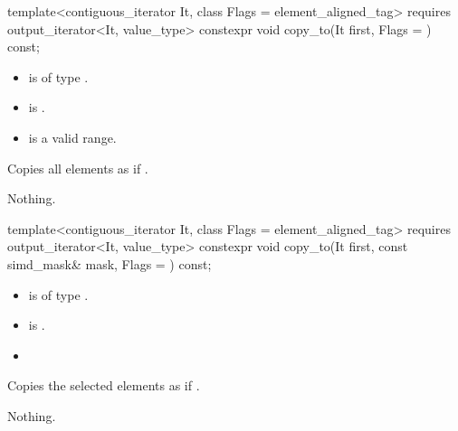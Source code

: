 \begin{itemdecl}
template<contiguous_iterator It, class Flags = element_aligned_tag>
  requires output_iterator<It, value_type>
  constexpr void copy_to(It first, Flags = {}) const;
\end{itemdecl}

\begin{itemdescr}
  \pnum\constraints
  \begin{itemize}
    \item {} is of type .
    \item {} is .
  \end{itemize}

  \pnum\requires
  \begin{itemize}
    \item \tcode{[first, first + size())} is a valid range.
  \end{itemize}

  \pnum\effects
  Copies all  elements as if  \foralli.

  \pnum\throws Nothing.
\end{itemdescr}

\begin{itemdecl}
template<contiguous_iterator It, class Flags = element_aligned_tag>
  requires output_iterator<It, value_type>
  constexpr void copy_to(It first, const simd_mask& mask, Flags = {}) const;
\end{itemdecl}

\begin{itemdescr}
  \pnum\constraints
  \begin{itemize}
    \item {} is of type .
    \item {} is .
  \end{itemize}

  \pnum\requires
  \begin{itemize}
    \item \validMaskedRange
  \end{itemize}

  \pnum\effects
  Copies the selected elements as if  \forallmaskedi.

  \pnum\throws Nothing.
\end{itemdescr}

